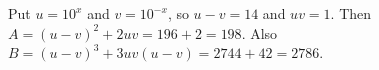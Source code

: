 Put $u=10^x$ and $v=10^{-x}$, so $u-v=14$ and $uv=1$. Then $A=(u-v)^2+2uv=196+2=\boxed{198}$. Also $B=(u-v)^3+3uv(u-v)=2744+42=\boxed{2786}$.
